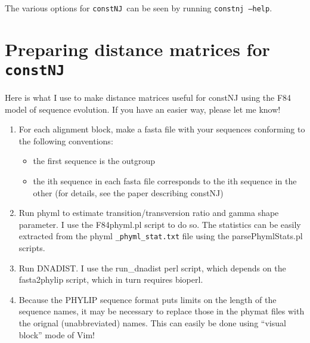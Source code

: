 \documentclass{article}
\newcommand{\constNJ}{\texttt{constNJ}}
\begin{document}
The various options for \constNJ\ can be seen by running \texttt{constnj --help}.


\section{Preparing distance matrices for \constNJ}

Here is what I use to make distance matrices useful for constNJ using the F84 model of sequence evolution. If you have an easier way, please let me know!

\begin{enumerate}
  \item For each alignment block, make a fasta file with your sequences conforming to the following conventions:
    \begin{itemize}
      \item the first sequence is the outgroup
      \item the ith sequence in each fasta file corresponds to the ith sequence in the other (for details, see the paper describing constNJ)
    \end{itemize}

  \item Run phyml to estimate transition/transversion ratio and gamma shape parameter.
    I use the F84phyml.pl script to do so.
    The statistics can be easily extracted from the phyml \texttt{\_phyml\_stat.txt} file using the parsePhymlStats.pl scripts.

  \item Run DNADIST. I use the run\_dnadist perl script, which depends on the fasta2phylip script, which in turn requires bioperl. 

  \item Because the PHYLIP sequence format puts limits on the length of the sequence names, it may be necessary to replace those in the phymat files with the orignal (unabbreviated) names. This can easily be done using ``visual block'' mode of Vim!

\end{enumerate}


%
%
\end{document}
